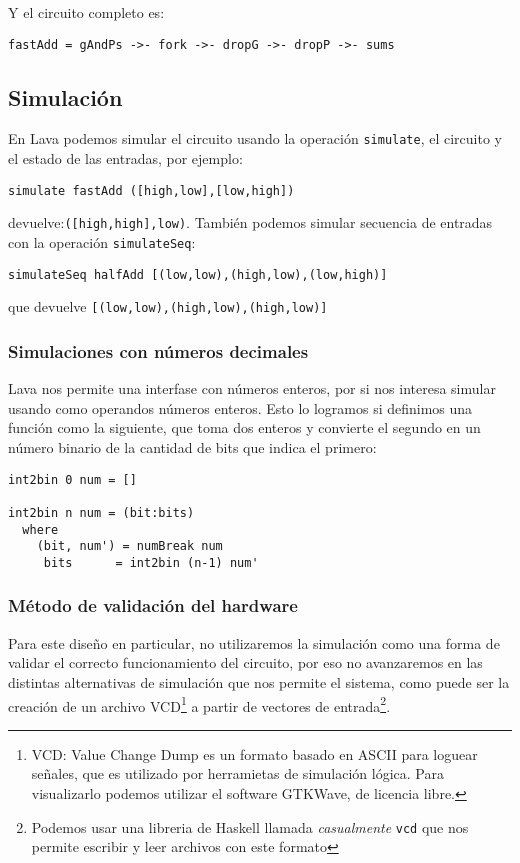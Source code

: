 \noindent Y el circuito completo es:
\begin{lstlisting}
fastAdd = gAndPs ->- fork ->- dropG ->- dropP ->- sums
\end{lstlisting}

\subsection{Simulación}
En Lava podemos simular el circuito usando la operación {\footnotesize\verb.simulate.}, el circuito y el estado de las entradas, por ejemplo:

{\footnotesize
\begin{verbatim}
simulate fastAdd ([high,low],[low,high])
\end{verbatim}
}

\noindent devuelve:{\footnotesize \verb|([high,high],low)|}. También podemos simular secuencia de entradas con la operación {\footnotesize\verb|simulateSeq|}:

{\footnotesize
\begin{verbatim} 
simulateSeq halfAdd [(low,low),(high,low),(low,high)]
\end{verbatim}
}

\noindent que devuelve {\footnotesize\verb|[(low,low),(high,low),(high,low)]|}

\subsubsection{Simulaciones con números decimales}
Lava nos permite una interfase con números enteros, por si nos interesa simular usando como operandos números enteros. Esto lo logramos si definimos una función como la siguiente, que toma dos enteros y convierte el segundo en un número binario de la cantidad de bits que indica el primero:
\begin{lstlisting}
int2bin 0 num = []

int2bin n num = (bit:bits)
  where
    (bit, num') = numBreak num
     bits      = int2bin (n-1) num'
\end{lstlisting}

\subsubsection{Método de validación del hardware}
Para este diseño en particular, no utilizaremos la simulación como una forma de validar el correcto funcionamiento del circuito, por eso no avanzaremos en las distintas alternativas de simulación que nos permite el sistema, como puede ser la creación de un archivo VCD\footnote{VCD: Value Change Dump es un formato basado en ASCII para loguear señales, que es utilizado por herramietas de simulación lógica. Para visualizarlo podemos utilizar el software GTKWave, de licencia libre.} a partir de vectores de entrada\footnote{Podemos usar una libreria de Haskell llamada \emph{casualmente} \verb.vcd. que nos permite escribir y leer archivos con este formato}.

